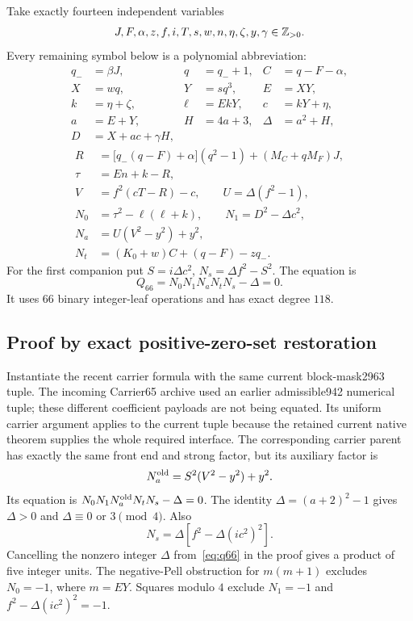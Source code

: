 \documentclass[11pt,letterpaper]{article}
\theoremstyle{definition}\newtheorem{definition}[theorem]{Definition}
\theoremstyle{remark}\newtheorem{remark}[theorem]{Remark}
\begin{document}
Take exactly fourteen independent variables
\[
J,F,\alpha,z,f,i,T,s,w,n,\eta,\zeta,y,\gamma\in\mathbb Z_{>0}.
\]
Every remaining symbol below is a polynomial abbreviation:
\begin{align*}
q_-&=\beta J,&q&=q_-+1,& C&=q-F-\alpha,\\
X&=wq,&Y&=s q^3,&E&=XY,\\
k&=\eta+\zeta,&\ell&=EkY,&c&=kY+\eta,\\
a&=E+Y,&H&=4a+3,&\Delta&=a^2+H,\\
D&=X+ac+\gamma H,&&&
\end{align*}
\begin{align*}
R&=\bigl[q_-(q-F)+\alpha\bigr](q^2-1)+(M_C+qM_F)J,\\
\tau&=En+k-R,\\
V&=f^2(cT-R)-c,\qquad U=\Delta(f^2-1),\\
N_0&=\tau^2-\ell(\ell+k),\qquad N_1=D^2-\Delta c^2,\\
N_a&=U(V^2-y^2)+y^2,\\
N_t&=(K_0+w)C+(q-F)-zq_-.
\end{align*}
For the first companion put $S=i\Delta c^2$, $N_s=\Delta f^2-S^2$. The equation is
\begin{equation}\label{eq:q66}
\boxed{Q_{66}=N_0N_1N_aN_tN_s-\Delta=0.}
\end{equation}
It uses $66$ binary integer-leaf operations and has exact degree $118$.

\subsection{Proof by exact positive-zero-set restoration}
Instantiate the recent carrier formula with the same current block-mask2963 tuple. The incoming Carrier65 archive used an earlier admissible942 numerical tuple; these different coefficient payloads are not being equated. Its uniform carrier argument applies to the current tuple because the retained current native theorem supplies the whole required interface. The corresponding carrier parent has exactly the same front end and strong factor, but its auxiliary factor is
\[
N_a^{\rm old}=S^2(V^2-y^2)+y^2.
\]
Its equation is $N_0N_1N_a^{\rm old}N_tN_s-\Delta=0$.
The identity $\Delta=(a+2)^2-1$ gives $\Delta>0$ and $\Delta\equiv0$ or $3\pmod4$. Also
\[
N_s=\Delta\left[f^2-\Delta(i c^2)^2\right].
\]
Cancelling the nonzero integer $\Delta$ from~\eqref{eq:q66} in the proof gives a product of five integer units. The negative-Pell obstruction for $m(m+1)$ excludes $N_0=-1$, where $m=EY$. Squares modulo $4$ exclude $N_1=-1$ and $f^2-\Delta(i c^2)^2=-1$.
\end{document}
